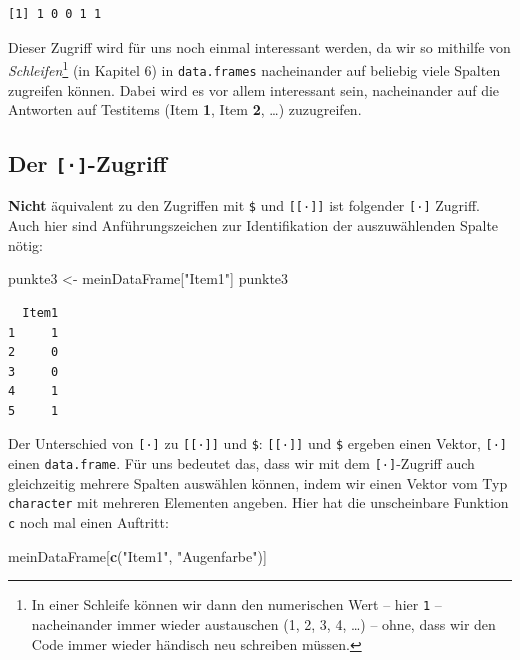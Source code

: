 \documentclass[12pt,]{tufte-book}
\newenvironment{Shaded}{\begin{snugshade}}{\end{snugshade}}
\newcommand{\KeywordTok}[1]{\textcolor[rgb]{0.13,0.29,0.53}{\textbf{#1}}}
\newcommand{\StringTok}[1]{\textcolor[rgb]{0.31,0.60,0.02}{#1}}
\newcommand{\NormalTok}[1]{#1}
\theoremstyle{definition}
\theoremstyle{definition}
\theoremstyle{definition}
\theoremstyle{remark}
\begin{document}
\begin{verbatim}
[1] 1 0 0 1 1
\end{verbatim}

Dieser Zugriff wird für uns noch einmal interessant werden, da wir so
mithilfe von \emph{Schleifen}\footnote{In einer Schleife können wir dann
  den numerischen Wert -- hier \texttt{1} -- nacheinander immer wieder
  austauschen (1, 2, 3, 4, \ldots{}) -- ohne, dass wir den Code immer
  wieder händisch neu schreiben müssen.} (in Kapitel 6) in
\texttt{data.frames} nacheinander auf beliebig viele Spalten zugreifen
können. Dabei wird es vor allem interessant sein, nacheinander auf die
Antworten auf Testitems (Item \textbf{1}, Item \textbf{2}, \ldots{})
zuzugreifen.

\subsection{\texorpdfstring{Der
\texttt{{[}·{]}}-Zugriff}{Der {[}·{]}-Zugriff}}\label{der--zugriff-1}

\textbf{Nicht} äquivalent zu den Zugriffen mit \texttt{\$} und
\texttt{{[}{[}·{]}{]}} ist folgender \texttt{{[}·{]}} Zugriff. Auch hier
sind Anführungszeichen zur Identifikation der auszuwählenden Spalte
nötig:

\begin{Shaded}
\begin{Highlighting}[]
\NormalTok{punkte3 <-}\StringTok{ }\NormalTok{meinDataFrame[}\StringTok{"Item1"}\NormalTok{]}
\NormalTok{punkte3}
\end{Highlighting}
\end{Shaded}

\begin{verbatim}
  Item1
1     1
2     0
3     0
4     1
5     1
\end{verbatim}

Der Unterschied von \texttt{{[}·{]}} zu \texttt{{[}{[}·{]}{]}} und
\texttt{\$}: \texttt{{[}{[}·{]}{]}} und \texttt{\$} ergeben einen
Vektor, \texttt{{[}·{]}} einen \texttt{data.frame}. Für uns bedeutet
das, dass wir mit dem \texttt{{[}·{]}}-Zugriff auch gleichzeitig mehrere
Spalten auswählen können, indem wir einen Vektor vom Typ
\texttt{character} mit mehreren Elementen angeben. Hier hat die
unscheinbare Funktion \texttt{c} noch mal einen Auftritt:

\begin{Shaded}
\begin{Highlighting}[]
\NormalTok{meinDataFrame[}\KeywordTok{c}\NormalTok{(}\StringTok{"Item1"}\NormalTok{, }\StringTok{"Augenfarbe"}\NormalTok{)]}
\end{Highlighting}
\end{Shaded}
\end{document}
